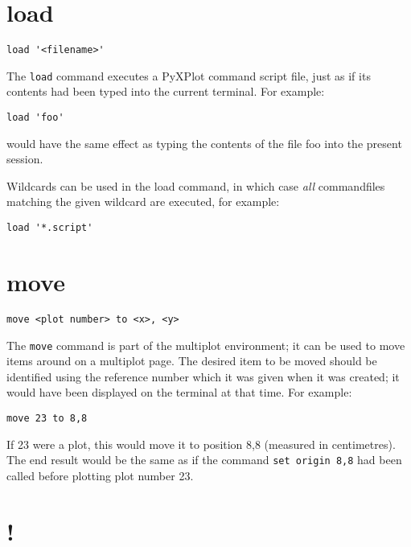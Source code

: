 \documentclass[a4paper,onecolumn,11pt]{book}
\begin{document}
\section{load}

\begin{verbatim}
load '<filename>'
\end{verbatim}

The {\tt load} command executes a PyXPlot command script file, just as if its
contents had been typed into the current terminal. For example:

\begin{verbatim}
load 'foo'
\end{verbatim}

would have the same effect as typing the contents of the file foo into the
present session.

Wildcards can be used in the load command, in which case \textit{all}
commandfiles matching the given wildcard are executed, for example:

\begin{verbatim}
load '*.script'
\end{verbatim}


\section{move}

\begin{verbatim}
move <plot number> to <x>, <y>
\end{verbatim}

The {\tt move} command is part of the multiplot environment; it can be used to
move items around on a multiplot page. The desired item to be moved should be
identified using the reference number which it was given when it was created;
it would have been displayed on the terminal at that time. For example:

\begin{verbatim}
move 23 to 8,8
\end{verbatim}
  
If 23 were a plot, this would move it to position 8,8 (measured in
centimetres). The end result would be the same as if the command {\tt set origin
8,8} had been called before plotting plot number 23.

\section{!}
\end{document}
